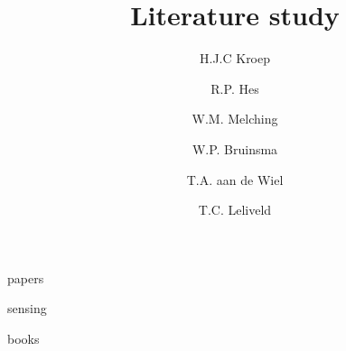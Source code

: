 \documentclass[report, a4paper, openany, oneside]{memoir}
\title{Literature study}
\author{H.J.C Kroep \and R.P. Hes \and W.M. Melching \and W.P. Bruinsma \and T.A. aan de Wiel \and T.C. Leliveld}
\begin{document}
\maketitle
\clearpage

\frontmatter
\tableofcontents

\mainmatter
{papers}

{sensing}

{books}

\printbibliography

\appendix
\end{document}
